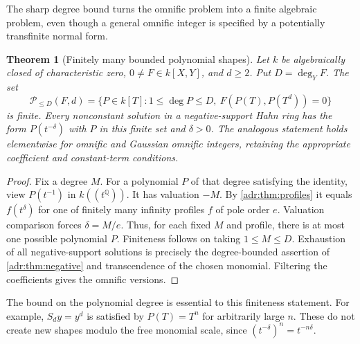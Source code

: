 \documentclass[11pt,letterpaper]{article}
\numberwithin{equation}{section}
\newtheorem{theorem}{Theorem}[section]
\theoremstyle{definition}
\theoremstyle{remark}
\newcommand{\Q}{\mathbb Q}
\begin{document}
The sharp degree bound turns the omnific problem into a finite algebraic
problem, even though a general omnific integer is specified by a
potentially transfinite normal form.

\begin{theorem}[Finitely many bounded polynomial shapes]
\label{adr:thm:finite-polynomials}
Let $k$ be algebraically closed of characteristic zero,
$0\ne F\in k[X,Y]$, and $d\ge2$. Put $D=\deg_YF$.
The set
\begin{equation}\label{adr:eq:polynomial-shapes}
 \mathcal P_{\le D}(F,d)=
 \{P\in k[T]:1\le\deg P\le D,
          \ F(P(T),P(T^d))=0\}
\end{equation}
is finite. Every nonconstant solution in a negative-support Hahn ring
has the form $P(t^{-\delta})$ with $P$ in this finite set and $\delta>0$.
The analogous statement holds elementwise for omnific and Gaussian
omnific integers, retaining the appropriate coefficient and constant-term
conditions.
\end{theorem}
\begin{proof}
Fix a degree $M$. For a polynomial $P$ of that degree satisfying the
identity, view $P(t^{-1})$ in $k((t^\Q))$. It has valuation $-M$.
By \cref{adr:thm:profiles} it equals $f(t^\delta)$ for one of finitely many
infinity profiles $f$ of pole order $e$. Valuation comparison forces
$\delta=M/e$. Thus, for each fixed $M$ and profile, there is at most
one possible polynomial $P$. Finiteness follows on taking
$1\le M\le D$. Exhaustion of all negative-support solutions is precisely
the degree-bounded assertion of \cref{adr:thm:negative} and transcendence of
the chosen monomial. Filtering the coefficients gives the omnific versions.
\end{proof}

The bound on the polynomial degree is essential to this finiteness
statement. For example, $S_dy=y^d$ is satisfied by $P(T)=T^n$ for
arbitrarily large $n$. These do not create new shapes modulo the free
monomial scale, since $(t^{-\delta})^n=t^{-n\delta}$.
\end{document}

